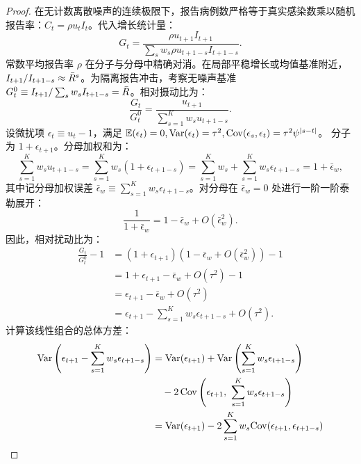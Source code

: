 \begin{proof}
在无计数离散噪声的连续极限下，报告病例数严格等于真实感染数乘以随机报告率：$C_t = \rho u_t I_t$。代入增长统计量：
\begin{equation}
  G_t = \frac{\rho u_{t+1} I_{t+1}}{\sum_s w_s \rho u_{t+1-s} I_{t+1-s}}.
\end{equation}
常数平均报告率 $\rho$ 在分子与分母中精确对消。在局部平稳增长或均值基准附近，$I_{t+1} / I_{t+1-s} \approx \bar{R}^s$。为隔离报告冲击，考察无噪声基准 $G_t^0 \equiv I_{t+1} / \sum_s w_s I_{t+1-s} = \bar{R}$。相对摄动比为：
\begin{equation}
  \frac{G_t}{G_t^0} = \frac{u_{t+1}}{\sum_{s=1}^K w_s u_{t+1-s}}.
\end{equation}
设微扰项 $\epsilon_t \equiv u_t - 1$，满足 $\mathbb{E}(\epsilon_t) = 0, \mathrm{Var}(\epsilon_t) = \tau^2, \mathrm{Cov}(\epsilon_s, \epsilon_t) = \tau^2 \psi^{|s-t|}$。
分子为 $1 + \epsilon_{t+1}$。分母加权和为：
\begin{equation}
  \sum_{s=1}^K w_s u_{t+1-s} = \sum_{s=1}^K w_s (1 + \epsilon_{t+1-s}) = \sum_{s=1}^K w_s + \sum_{s=1}^K w_s \epsilon_{t+1-s} = 1 + \bar{\epsilon}_w,
\end{equation}
其中记分母加权误差 $\bar{\epsilon}_w \equiv \sum_{s=1}^K w_s \epsilon_{t+1-s}$。对分母在 $\bar{\epsilon}_w = 0$ 处进行一阶一阶泰勒展开：
\begin{equation}
  \frac{1}{1 + \bar{\epsilon}_w} = 1 - \bar{\epsilon}_w + O(\bar{\epsilon}_w^2).
\end{equation}
因此，相对扰动比为：
\begin{align}
  \frac{G_t}{G_t^0} - 1 &= (1 + \epsilon_{t+1})(1 - \bar{\epsilon}_w + O(\bar{\epsilon}_w^2)) - 1 \nonumber \\
  &= 1 + \epsilon_{t+1} - \bar{\epsilon}_w + O(\tau^2) - 1 \nonumber \\
  &= \epsilon_{t+1} - \bar{\epsilon}_w + O(\tau^2) \nonumber \\
  &= \epsilon_{t+1} - \sum_{s=1}^K w_s \epsilon_{t+1-s} + O(\tau^2).
\end{align}
计算该线性组合的总体方差：
\begin{align}
  \Var\left( \epsilon_{t+1} - \sum_{s=1}^K w_s \epsilon_{t+1-s} \right) &= \Var(\epsilon_{t+1}) + \Var\left( \sum_{s=1}^K w_s \epsilon_{t+1-s} \right) \nonumber \\
  &\quad - 2\,\Cov\left( \epsilon_{t+1},\ \sum_{s=1}^K w_s \epsilon_{t+1-s} \right) \nonumber \\
  &= \Var(\epsilon_{t+1}) - 2 \sum_{s=1}^K w_s \Cov(\epsilon_{t+1}, \epsilon_{t+1-s}) \nonumber \\

\end{align}
\end{proof}
